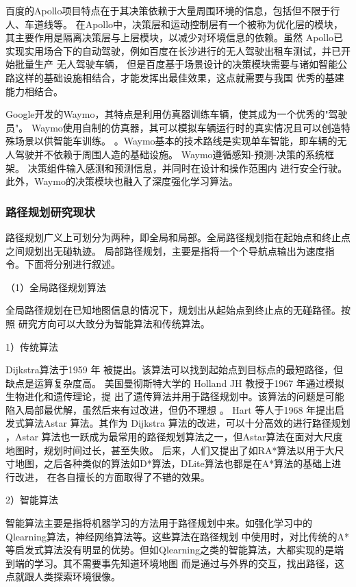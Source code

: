 百度的Apollo项目特点在于其决策依赖于大量周围环境的信息，包括但不限于行人、车道线等。
在Apollo中，决策层和运动控制层有一个被称为优化层的模块，其主要作用是隔离决策层与上层模块，以减少对环境信息的依赖。虽然
Apollo已实现实用场合下的自动驾驶，例如百度在长沙进行的无人驾驶出租车测试，并已开始批量生产
无人驾驶车辆，
但是百度基于场景设计的决策模块需要与诸如智能公路这样的基础设施相结合，才能发挥出最佳效果，这点就需要与我国
优秀的基建能力相结合。

Google开发的Waymo，其特点是利用仿真器训练车辆，使其成为一个优秀的"驾驶员"。
Waymo使用自制的仿真器，其可以模拟车辆运行时的真实情况且可以创造特殊场景以供智能车训练。
。Waymo基本的技术路线是实现单车智能，即车辆的无人驾驶并不依赖于周围人造的基础设施。
Waymo遵循感知-预测-决策的系统框架。
决策组件输入感测和预测信息，并同时在设计和操作范围内
进行安全行驶。此外，Waymo的决策模块也融入了深度强化学习算法。


\subsubsection{路径规划研究现状}
路径规划广义上可划分为两种，即全局和局部。全局路径规划指在起始点和终止点之间规划出无碰轨迹。
局部路径规划，主要是指将一个个导航点输出为速度指令。下面将分别进行叙述。

（1）全局路径规划算法

全局路径规划在已知地图信息的情况下，规划出从起始点到终止点的无碰路径。按照
研究方向可以大致分为智能算法和传统算法。

1）传统算法

 Dijkstra算法于1959 年 被提出。该算法可以找到起始点到目标点的最短路径，但缺点是运算复杂度高。
美国曼彻斯特大学的 Holland JH 教授于1967 年通过模拟生物进化和遗传理论，提
出了遗传算法并用于路径规划中。该算法的问题是可能陷入局部最优解，虽然后来有过改进，但仍不理想
。
 Hart 等人于1968 年提出启发式算法Astar 算法。其作为 Dijkstra 算法的改进，可以十分高效的进行路径规划
 ，Astar 算法也一跃成为最常用的路径规划算法之一，但Astar算法在面对大尺度地图时，规划时间过长，甚至失败。
后来，人们又提出了如RA*算法以用于大尺寸地图，之后各种类似的算法如D*算法，DLite算法也都是在A*算法的基础上进行改进，
在各自擅长的方面取得了不错的效果。

2）智能算法

智能算法主要是指将机器学习的方法用于路径规划中来。如强化学习中的Qlearning算法，神经网络算法等。这些算法在路径规划
中使用时，对比传统的A*等启发式算法没有明显的优势。但如Qlearning之类的智能算法，大都实现的是端到端的学习。其不需要事先知道环境地图
而是通过与外界的交互，找出路径，这点就跟人类探索环境很像。


